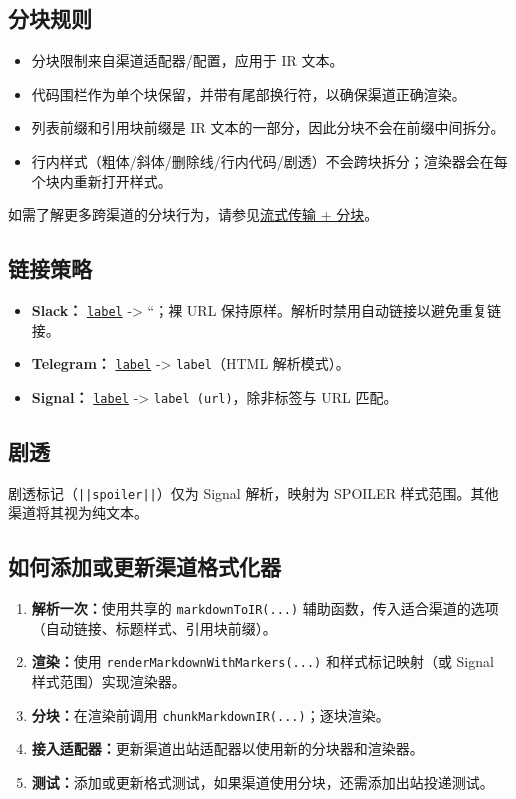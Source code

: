 \subsection{分块规则}


\begin{itemize}
  \item 分块限制来自渠道适配器/配置，应用于 IR 文本。
  \item 代码围栏作为单个块保留，并带有尾部换行符，以确保渠道正确渲染。
  \item 列表前缀和引用块前缀是 IR 文本的一部分，因此分块不会在前缀中间拆分。
  \item 行内样式（粗体/斜体/删除线/行内代码/剧透）不会跨块拆分；渲染器会在每个块内重新打开样式。
\end{itemize}


如需了解更多跨渠道的分块行为，请参见\href{/concepts/streaming}{流式传输 + 分块}。

\subsection{链接策略}


\begin{itemize}
  \item \textbf{Slack：} \texttt{\href{url}{label}} -> ``；裸 URL 保持原样。解析时禁用自动链接以避免重复链接。
  \item \textbf{Telegram：} \texttt{\href{url}{label}} -> \texttt{label}（HTML 解析模式）。
  \item \textbf{Signal：} \texttt{\href{url}{label}} -> \texttt{label (url)}，除非标签与 URL 匹配。
\end{itemize}


\subsection{剧透}


剧透标记（\texttt{||spoiler||}）仅为 Signal 解析，映射为 SPOILER 样式范围。其他渠道将其视为纯文本。

\subsection{如何添加或更新渠道格式化器}


\begin{enumerate}
  \item \textbf{解析一次：}使用共享的 \texttt{markdownToIR(...)} 辅助函数，传入适合渠道的选项（自动链接、标题样式、引用块前缀）。
  \item \textbf{渲染：}使用 \texttt{renderMarkdownWithMarkers(...)} 和样式标记映射（或 Signal 样式范围）实现渲染器。
  \item \textbf{分块：}在渲染前调用 \texttt{chunkMarkdownIR(...)}；逐块渲染。
  \item \textbf{接入适配器：}更新渠道出站适配器以使用新的分块器和渲染器。
  \item \textbf{测试：}添加或更新格式测试，如果渠道使用分块，还需添加出站投递测试。
\end{enumerate}


